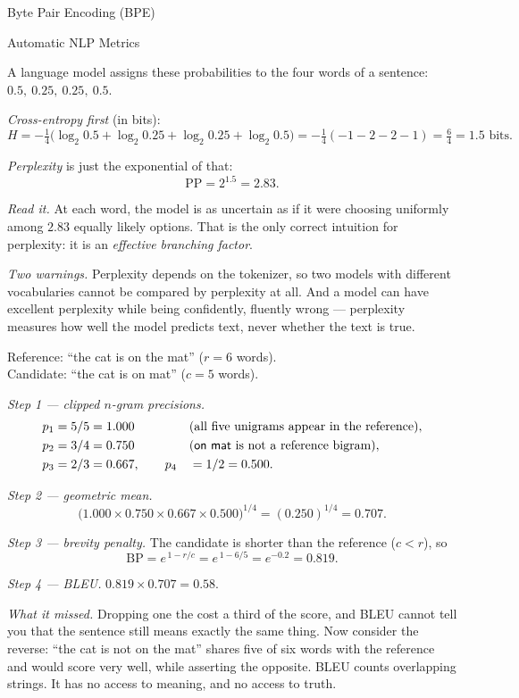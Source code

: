 \begin{v3topic}{Byte Pair Encoding (BPE)}
\begin{v3topic}{Automatic NLP Metrics}
\begin{workedexample}
A language model assigns these probabilities to the four words of a sentence:
$0.5,\ 0.25,\ 0.25,\ 0.5$.

\emph{Cross-entropy first} (in bits):
\[
  H = -\tfrac{1}{4}\bigl(\log_2 0.5 + \log_2 0.25 + \log_2 0.25
      + \log_2 0.5\bigr)
    = -\tfrac{1}{4}(-1-2-2-1) = \tfrac{6}{4} = 1.5 \text{ bits.}
\]

\emph{Perplexity} is just the exponential of that:
\[
  \mathrm{PP} = 2^{1.5} = 2.83 .
\]

\emph{Read it.} At each word, the model is as uncertain as if it were choosing
uniformly among $2.83$ equally likely options. That is the only correct
intuition for perplexity: it is an \emph{effective branching factor}.

\emph{Two warnings.} Perplexity depends on the tokenizer, so two models with
different vocabularies cannot be compared by perplexity at all. And a model can
have excellent perplexity while being confidently, fluently wrong --- perplexity
measures how well the model predicts text, never whether the text is true.
\end{workedexample}

\begin{workedexample}
\textsf{Reference:} ``the cat is on the mat'' ($r = 6$ words). \\
\textsf{Candidate:} ``the cat is on mat'' ($c = 5$ words).

\emph{Step 1 --- clipped $n$-gram precisions.}
\[
\begin{aligned}
  p_1 &= 5/5 = 1.000 &&\text{(all five unigrams appear in the reference)},\\
  p_2 &= 3/4 = 0.750 &&\text{(\textsf{on mat} is not a reference bigram)},\\
  p_3 &= 2/3 = 0.667, \qquad p_4 &&= 1/2 = 0.500 .
\end{aligned}
\]

\emph{Step 2 --- geometric mean.}
\[
  \bigl(1.000 \times 0.750 \times 0.667 \times 0.500\bigr)^{1/4}
  = (0.250)^{1/4} = 0.707 .
\]

\emph{Step 3 --- brevity penalty.} The candidate is shorter than the reference
($c < r$), so
\[
  \mathrm{BP} = e^{\,1 - r/c} = e^{\,1-6/5} = e^{-0.2} = 0.819 .
\]

\emph{Step 4 --- BLEU.} $0.819 \times 0.707 = \mathbf{0.58}$.

\emph{What it missed.} Dropping one \textsf{the} cost a third of the score, and
BLEU cannot tell you that the sentence still means exactly the same thing. Now
consider the reverse: ``the cat is not on the mat'' shares five of six words
with the reference and would score very well, while asserting the opposite. BLEU
counts overlapping strings. It has no access to meaning, and no access to truth.
\end{workedexample}


\end{v3topic}
\end{v3topic}
